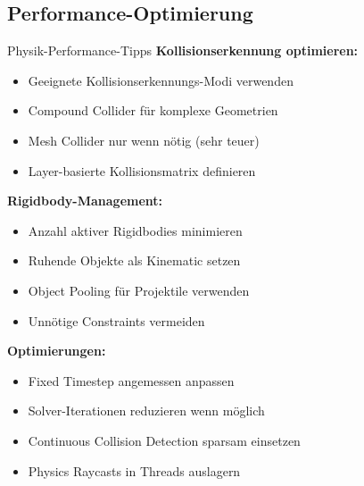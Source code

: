 \subsection{Performance-Optimierung}

\begin{concept}{Physik-Performance-Tipps}
    \textbf{Kollisionserkennung optimieren:}
    \begin{itemize}
        \item Geeignete Kollisionserkennungs-Modi verwenden
        \item Compound Collider für komplexe Geometrien
        \item Mesh Collider nur wenn nötig (sehr teuer)
        \item Layer-basierte Kollisionsmatrix definieren
    \end{itemize}
    
    \textbf{Rigidbody-Management:}
    \begin{itemize}
        \item Anzahl aktiver Rigidbodies minimieren
        \item Ruhende Objekte als Kinematic setzen
        \item Object Pooling für Projektile verwenden
        \item Unnötige Constraints vermeiden
    \end{itemize}
    
    \textbf{Optimierungen:}
    \begin{itemize}
        \item Fixed Timestep angemessen anpassen
        \item Solver-Iterationen reduzieren wenn möglich
        \item Continuous Collision Detection sparsam einsetzen
        \item Physics Raycasts in Threads auslagern
    \end{itemize}
\end{concept}

